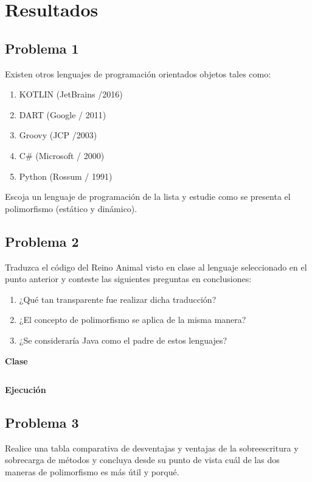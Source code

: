\documentclass[11pt, twocolumn]{article}
\begin{document}
  \newpage
  \section*{Resultados}
  \subsection*{Problema 1}
  Existen otros lenguajes de programación orientados objetos tales como:

  \begin{enumerate}[label=\alph*.]
    \item KOTLIN (JetBrains /2016)
    \item DART (Google / 2011)
    \item Groovy (JCP /2003)
    \item C$\#$ (Microsoft / 2000)
    \item Python (Rossum / 1991)
  \end{enumerate}
  
  Escoja un lenguaje de programación de la lista y estudie como se presenta el polimorfismo (estático y dinámico).

  \subsection*{Problema 2}
  Traduzca el código del Reino Animal visto en clase al lenguaje seleccionado en el punto anterior y conteste las siguientes preguntas en conclusiones:

  \begin{enumerate}[label=\alph*.]
    \item ¿Qué tan transparente fue realizar dicha traducción?
    \item ¿El concepto de polimorfismo se aplica de la misma manera?
    \item ¿Se consideraría Java como el padre de estos lenguajes?
  \end{enumerate}

  \textbf{Clase \textit{}}
  \begin{lstlisting}[language=Java]

  \end{lstlisting}  
  
  \textbf{Ejecución}

  \subsection*{Problema 3}
  Realice una tabla comparativa de desventajas y ventajas de la sobreescritura y sobrecarga de métodos y concluya desde su punto de vista cuál de las dos maneras de polimorfismo es más útil y porqué.
\end{document}
